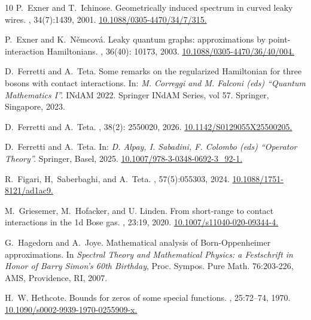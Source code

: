 \documentclass[a4paper,11pt,reqno]{amsart}
\theoremstyle{definition}
\numberwithin{equation}{section}
\begin{document}
\begin{thebibliography}{10}
P.~Exner and T.~Ichinose.
\newblock Geometrically induced spectrum in curved leaky wires.
, 34(7):1439, 2001. \href{https://doi.org/10.1088/0305-4470/34/7/315}{10.1088/0305-4470/34/7/315.}

P.~Exner and K.~N\v{e}mcov\'a.
\newblock Leaky quantum graphs: approximations by point-interaction Hamiltonians.
, 36(40): 10173, 2003. \href{https://doi.org/10.1088/0305-4470/36/40/004}{10.1088/0305-4470/36/40/004.}

D.~Ferretti and A.~Teta.
\newblock Some remarks on the regularized Hamiltonian for three bosons with contact interactions.
\newblock In: {\em M. Correggi and M. Falconi (eds) ``Quantum Mathematics I''.} INdAM 2022. Springer INdAM Series, vol 57. Springer, Singapore, 2023.

D.~Ferretti and A.~Teta.
, 38(2): 2550020, 2026.  \href{https://doi.org/10.1142/S0129055X25500205}{10.1142/S0129055X25500205.}

D.~Ferretti and A.~Teta.
\newblock In: {\em D. Alpay, I. Sabadini, F. Colombo (eds) ``Operator Theory''.} Springer, Basel, 2025. \href{https://doi.org/10.1007/978-3-0348-0692-3_92-1}{10.1007/978-3-0348-0692-3\_92-1.}

R.~Figari, H,~Saberbaghi, and A.~Teta.
, 57(5):055303, 2024. \href{https://doi.org/10.1088/1751-8121/ad1ac9}{10.1088/1751-8121/ad1ac9.}

M.~Griesemer, M.~Hofacker, and U. Linden.
\newblock From short-range to contact interactions in the 1d Bose gas. 
, 23:19, 2020. \href{https://doi.org/10.1007/s11040-020-09344-4}{10.1007/s11040-020-09344-4.}

G.~Hagedorn and A.~Joye.
\newblock Mathematical analysis of Born-Oppenheimer approximations.
\newblock In {\em Spectral Theory and Mathematical Physics: a Festschrift in Honor of Barry Simon's 60th Birthday}, Proc. Sympos. Pure Math. 76:203-226, AMS, Providence, RI,  2007.

H.~W. Hethcote.
\newblock Bounds for zeros of some special functions.
, 25:72--74, 1970. \href{https://doi.org/10.1090/s0002-9939-1970-0255909-x}{10.1090/s0002-9939-1970-0255909-x.}


\end{thebibliography}
\end{document}
